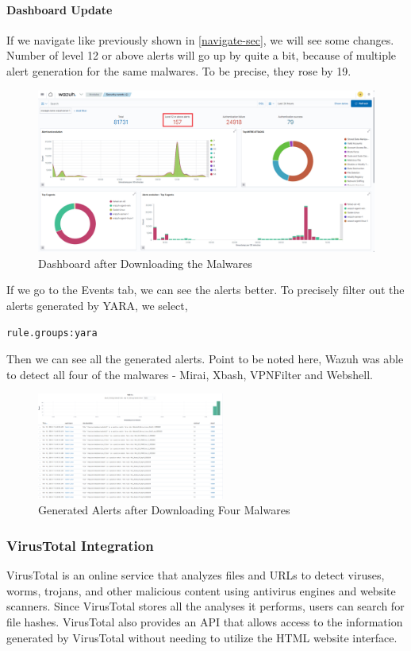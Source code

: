 \paragraph{Dashboard Update}
If we navigate like previously shown in \ref{navigate-sec}, we will see some changes. Number of level 12 or above alerts will go up by quite a bit, because of multiple alert generation for the same malwares. To be precise, they rose by 19. 
    \begin{figure}[H]
        \centering
        \includegraphics[width=\textwidth]{images/malware-detection/yara/6.png}
        \caption{Dashboard after Downloading the Malwares}
        \label{fig:yara-post-download}
    \end{figure}
If we go to the Events tab, we can see the alerts better. To precisely filter out the alerts generated by YARA, we select,
\begin{verbatim}
rule.groups:yara
\end{verbatim}
Then we can see all the generated alerts. Point to be noted here, Wazuh was able to detect all four of the malwares - Mirai, Xbash, VPNFilter and Webshell.
    \begin{figure}[H]
        \centering
        \includegraphics[width=0.55\textwidth]{images/malware-detection/yara/7.png}
        \caption{Generated Alerts after Downloading Four Malwares}
        \label{fig:yara-alerts}
    \end{figure}

\subsubsection{VirusTotal Integration}
\label{virustotal}
VirusTotal is an online service that analyzes files and URLs to detect viruses, worms, trojans, and other malicious content using antivirus engines and website scanners. Since VirusTotal stores all the analyses it performs, users can search for file hashes. VirusTotal also provides an API that allows access to the information generated by VirusTotal without needing to utilize the HTML website interface.

